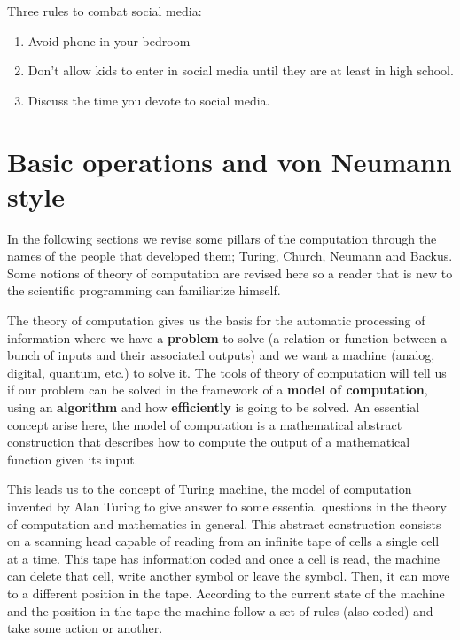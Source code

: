   
%  
%  
%  
% 

  
   
Three rules to combat social media:
\begin{enumerate} 
\item Avoid phone in your bedroom
\item Don't allow kids to enter in social media until they are at least in high school. 
\item Discuss the time you devote to social media. 
\end{enumerate} 

 
\newpage   
\section{Basic operations and von Neumann style} 


In the following sections we revise some pillars of the computation through the names of the people 
that developed them; Turing, Church, Neumann and Backus. 
Some notions of theory of computation are revised here so a reader that is new 
to the scientific programming can familiarize himself. 

The theory of computation gives us the basis for the automatic processing of information where we have a \textbf{problem} to solve (a 
relation or function between a bunch of inputs and their associated outputs) and we want a machine (analog, digital, quantum, etc.) to solve 
it. 
The tools of theory of computation will tell us if our problem can be solved in the framework of a \textbf{model of computation}, using an 
\textbf{algorithm} and how \textbf{efficiently} is going to be solved. 
An essential concept arise here, the model of computation is a mathematical abstract construction that describes how to compute the output of 
a mathematical function given its input. 

This leads us to the concept of Turing machine, the model of computation invented by Alan Turing to give answer to some essential questions 
in the theory of computation and mathematics in general. This abstract construction consists on a scanning head capable of reading from an 
infinite tape of cells a single cell at a time. This tape has information coded and once a cell is read, the machine can delete that cell, 
write another symbol or leave the symbol. Then, it can move to a different position in the tape. According to the current state of the 
machine and the position in the tape the machine follow a set of rules (also coded) and take some action or another. 


